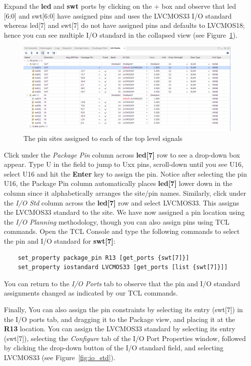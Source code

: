 \documentclass[11pt]{article}
\begin{document}
Expand the \textbf{led} and \textbf{swt} ports by clicking on the + box and observe that led [6:0] and swt[6:0] have assigned pins and uses the LVCMOS33 I/O standard whereas led[7] and swt[7] do not have assigned pins and defaults to LVCMOS18; hence you can see multiple I/O standard in the collapsed view (see Figure~\ref{fig:io_expand}). 

\begin{figure}[!h]
    \centering
    \includegraphics[width=\textwidth]{images/io_expand.png}
    \caption{The pin sites assigned to each of the top level signals}
    \label{fig:io_expand}
\end{figure}

Click under the \textit{Package Pin} column across \textbf{led[7]} row to see a drop-down box appear. Type U in the field to jump to Uxx pins, scroll-down until you see U16, select U16 and hit the \textbf{Enter} key to assign the pin. Notice after selecting the pin U16, the Package Pin column automatically places \textbf{led[7]} lower down in the column since it alphabetically arranges the site/pin names. Similarly, click under the \textit{I/O Std} column across the \textbf{led[7]} row and select LVCMOS33. This assigns the LVCMOS33 standard to the site. We have now assigned a pin location using the \textit{I/O Planning} methodology, though you can also assign pins using TCL commands. Open the TCL Console and type the following commands to select the pin and I/O standard for \textbf{swt[7]}:

\begin{verbatim}
    set_property package_pin R13 [get_ports {swt[7]}]
    set_property iostandard LVCMOS33 [get_ports [list {swt[7]}]]
\end{verbatim}

\noindent
You can return to the \textit{I/O Ports} tab to observe that the pin and I/O standard assignments changed as indicated by our TCL commands. 

Finally, You can also assign the pin constraints by selecting its entry (swt[7]) in the I/O ports tab, and dragging it to the Package view, and placing it at the \textbf{R13} location. You can assign the LVCMOS33 standard by selecting its entry (swt[7]), selecting the \textit{Configure} tab of the I/O Port Properties window, followed by clicking the drop-down button of the I/O standard field, and selecting LVCMOS33 (see Figure~\ref{fig:io_std}).
\end{document}
